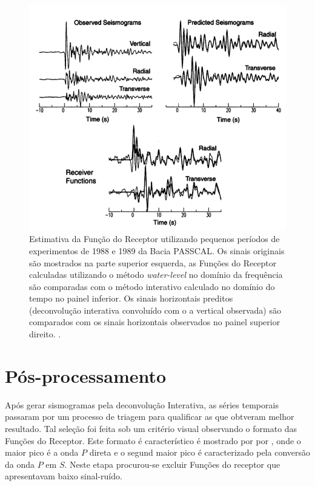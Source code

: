 \begin{figure}[!ht]
\centering
\includegraphics[scale=0.5]{Figs/deconvolucao_interativa.png}
\caption[Estimativa da Função do Receptor utilizando pequenos períodos.]{Estimativa da Função do Receptor utilizando pequenos períodos de experimentos de 1988 e 1989 da Bacia PASSCAL. Os sinais originais são mostrados na parte superior esquerda, as Funções do Receptor calculadas utilizando o método \textit{water-level} no domínio da frequência são comparadas com o método interativo calculado no domínio do tempo no painel inferior. Os sinais horizontais preditos (deconvolução interativa convoluído com o a vertical observada) são comparados com os sinais horizontais observados no painel superior direito. \citep{ligorria_iterative_1999}.}
\label{deconvolucao_interativa}
\end{figure}

\section{Pós-processamento}

Após gerar sismogramas pela deconvolução Interativa, as séries temporais passaram por um processo de triagem para qualificar as que obtveram melhor resultado. Tal seleção foi feita sob um critério visual observando o formato das Funções do Receptor. Este formato é característico é mostrado por por \citep{langston_structure_1979}, onde o maior pico é a onda $P$ direta e o segund maior pico é caracterizado pela conversão da onda $P$ em $S$. Neste etapa procurou-se excluir Funções do receptor que apresentavam baixo sinal-ruído.

